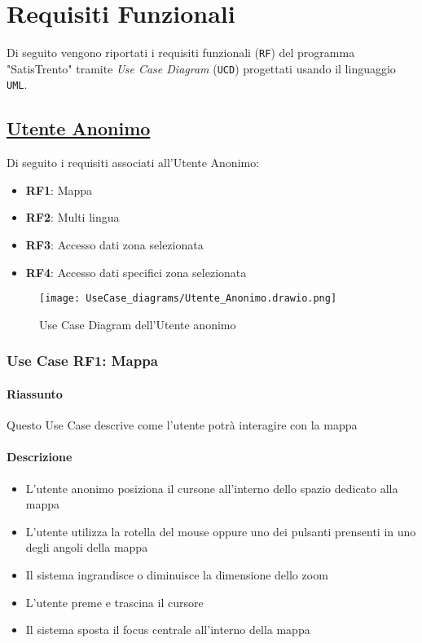 \chapter{Requisiti Funzionali}
\label{ch:requisitiFunzionali}

Di seguito vengono riportati i requisiti funzionali (\texttt{RF}) del programma "SatisTrento" tramite \textit{Use Case Diagram} (\texttt{UCD}) progettati usando il linguaggio \texttt{UML}.

\section{\underline{Utente Anonimo}}
    Di seguito i requisiti associati all'Utente Anonimo:
    \begin{itemize}
        \item \textbf{RF1}: Mappa
        \item \textbf{RF2}: Multi lingua
        \item \textbf{RF3}: Accesso dati zona selezionata
        \item \textbf{RF4}: Accesso dati specifici zona selezionata
    \end{itemize}
    \begin{figure}[H]
        \centering
        \texttt{[image: UseCase\_diagrams/Utente\_Anonimo.drawio.png]}
        \caption{Use Case Diagram dell'Utente anonimo}
    \end{figure}

    \subsection{Use Case {RF1}: Mappa}
        \subsubsection{Riassunto}
            Questo Use Case descrive come l'utente potrà interagire con la mappa
        \subsubsection{Descrizione}
            \begin{itemize}
                \item L'utente anonimo posiziona il cursone all'interno dello spazio dedicato alla mappa
                \item L'utente utilizza la rotella del mouse oppure uno dei pulsanti prensenti in uno degli angoli della mappa
                \item Il sistema ingrandisce o diminuisce la dimensione dello zoom
                \item L'utente preme e trascina il cursore
                \item Il sistema sposta il focus centrale all'interno della mappa
            \end{itemize}
